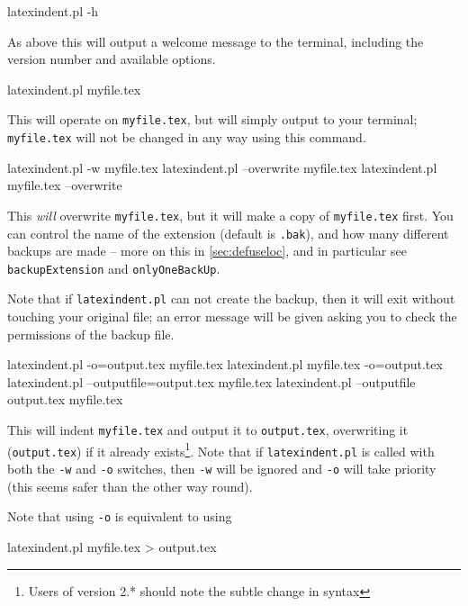 
\begin{commandshell}
latexindent.pl -h
      \end{commandshell}

As above this will output a welcome message to the terminal, including the version number
and available options.
\begin{commandshell}
latexindent.pl myfile.tex
      \end{commandshell}

This will operate on \texttt{myfile.tex}, but will simply output to your terminal; \texttt{myfile.tex} will	not be changed in any way using this command.

\begin{commandshell}
latexindent.pl -w myfile.tex
latexindent.pl --overwrite myfile.tex
latexindent.pl myfile.tex --overwrite 
      \end{commandshell}

This \emph{will} overwrite \texttt{myfile.tex}, but it will
make a copy of \texttt{myfile.tex} first. You can control the name of
the extension (default is \texttt{.bak}), and how many different backups are made --
more on this in \cref{sec:defuseloc}, and in particular see \texttt{backupExtension} and \texttt{onlyOneBackUp}.

Note that if \texttt{latexindent.pl} can not create the backup, then it
will exit without touching your original file; an error message will be given
asking you to check the permissions of the backup file.

\begin{commandshell} 
latexindent.pl -o=output.tex myfile.tex
latexindent.pl myfile.tex -o=output.tex 
latexindent.pl --outputfile=output.tex myfile.tex
latexindent.pl --outputfile output.tex myfile.tex
      \end{commandshell}

This will indent \texttt{myfile.tex} and output it to \texttt{output.tex},
overwriting it (\texttt{output.tex}) if it already exists\footnote{Users of version 2.* should
	note the subtle change in syntax}. Note that if \texttt{latexindent.pl} is called with both
the \texttt{-w} and \texttt{-o} switches, then \texttt{-w} will
be ignored and \texttt{-o} will take priority (this seems safer than the
other way round).

Note that using \texttt{-o} is equivalent to using 
\begin{commandshell}
latexindent.pl myfile.tex > output.tex
\end{commandshell}

